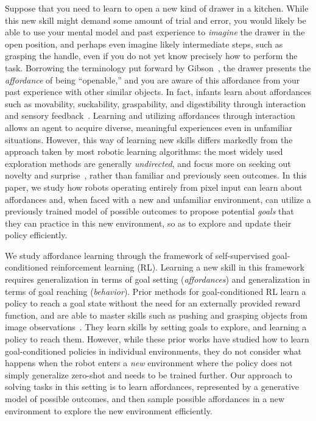 \documentclass[letterpaper, 10 pt, conference]{ieeeconf}  %
\begin{document}
Suppose that you need to learn to open a new kind of drawer in a kitchen. While this new skill might demand some amount of trial and error, you would likely be able to use your mental model and past experience to \emph{imagine} the drawer in the open position, and perhaps even imagine likely intermediate steps, such as grasping the handle, even if you do not yet know precisely how to perform the task. Borrowing the terminology put forward by Gibson~\cite{gibson1979ecologicalapproach}, the drawer presents the \emph{affordance} of being ``openable,'' and you are aware of this affordance from your past experience with other similar objects. 
In fact, infants learn about affordances such as movability, suckability, graspability, and digestibility through interaction and sensory feedback~\cite{berger2014development}.
Learning and utilizing affordances through interaction allows an agent to acquire diverse, meaningful experiences even in unfamiliar situations.
However, this way of learning new skills differs markedly from the approach taken by most robotic learning algorithms: the most widely used exploration methods are generally \emph{undirected}, and focus more on seeking out novelty and surprise~\cite{houthooft2016vime, tang2017hashtag, pathak2017curiosity}, rather than familiar and previously seen outcomes.
In this paper, we study how robots operating entirely from pixel input can learn about affordances and, when faced with a new and unfamiliar environment, can utilize a previously trained model of possible outcomes to propose potential \emph{goals} that they can practice in this new environment, so as to explore and update their policy efficiently.



We study affordance learning through the framework of self-supervised goal-conditioned reinforcement learning (RL).
Learning a new skill in this framework requires generalization in terms of goal setting (\emph{affordances}) and generalization in terms of goal reaching (\emph{behavior}).
Prior methods for goal-conditioned RL learn a policy to reach a goal state without the need for an externally provided reward function, and are able to master skills such as pushing and grasping objects from image observations~\cite{agrawal2016poking, nair2018rig, lynch2019play, nair2019ccrig}.
They learn skills by setting goals to explore, and learning a policy to reach them.
However, while these prior works have studied how to learn goal-conditioned policies in individual environments, they do not consider what happens when the robot enters a \emph{new} environment where the policy does not simply generalize zero-shot and needs to be trained further. 
Our approach to solving tasks in this setting is to learn affordances, represented by a generative model of possible outcomes, and then sample possible affordances in a new environment to explore the new environment efficiently.
\end{document}
